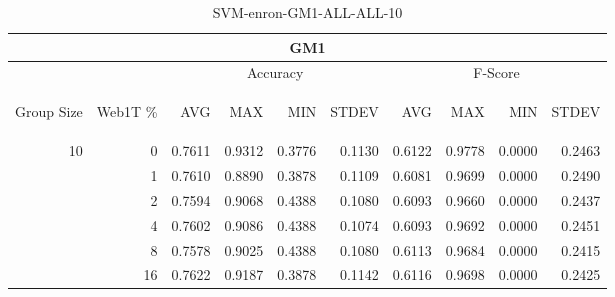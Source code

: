 \begin{center}
\begin{table}[htbp] 
 \begin{center}
\begin{tabular}{ | r | r | r | r | r | r | r | r | r | r |}
\hline
\multicolumn{10}{|c|}{GM1}\\
\hline
 & & \multicolumn{4}{|c|}{Accuracy} & \multicolumn{4}{|c|}{F-Score}\\ \cline{3-10}
\begin{sideways}Group Size\end{sideways} & \begin{sideways}Web1T \%\end{sideways} & \begin{sideways}AVG\end{sideways} & \begin{sideways}MAX\end{sideways} & \begin{sideways}MIN\end{sideways} & \begin{sideways}STDEV\end{sideways} & \begin{sideways}AVG\end{sideways} & \begin{sideways}MAX\end{sideways} & \begin{sideways}MIN\end{sideways} & \begin{sideways}STDEV\end{sideways}\\
\hline
\multirow{5}{*}{10}
 & 0 & 0.7611 & 0.9312 & 0.3776 & 0.1130 & 0.6122 & 0.9778 & 0.0000 & 0.2463\\ \cline{2-10}
 & 1 & 0.7610 & 0.8890 & 0.3878 & 0.1109 & 0.6081 & 0.9699 & 0.0000 & 0.2490\\ \cline{2-10}
 & 2 & 0.7594 & 0.9068 & 0.4388 & 0.1080 & 0.6093 & 0.9660 & 0.0000 & 0.2437\\ \cline{2-10}
 & 4 & 0.7602 & 0.9086 & 0.4388 & 0.1074 & 0.6093 & 0.9692 & 0.0000 & 0.2451\\ \cline{2-10}
 & 8 & 0.7578 & 0.9025 & 0.4388 & 0.1080 & 0.6113 & 0.9684 & 0.0000 & 0.2415\\ \cline{2-10}
 & 16 & 0.7622 & 0.9187 & 0.3878 & 0.1142 & 0.6116 & 0.9698 & 0.0000 & 0.2425\\ \cline{2-10}
\hline
\end{tabular}
\caption{SVM-enron-GM1-ALL-ALL-10}
\label{table:SVM-enron-GM1-ALL-ALL-10}
\end{center}
 \end{table}
\end{center}

